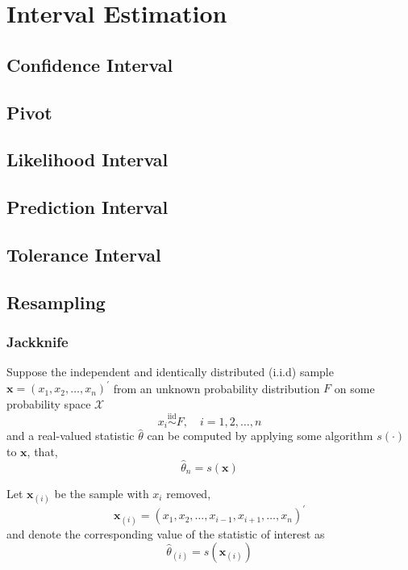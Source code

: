 
\chapter{Interval Estimation}

\section{Confidence Interval}

\section{Pivot}

\section{Likelihood Interval}

\section{Prediction Interval}

\section{Tolerance Interval}

\section{Resampling}

\subsection{Jackknife}

Suppose the independent and identically distributed (i.i.d) sample $\boldsymbol{x}=\left(x_{1},x_{2},\ldots,x_{n}\right)^{\prime}$ from an unknown probability distribution $F$ on some probability space $\mathcal{X}$
\begin{equation}
    x_{i}\stackrel{\text{iid}}{\sim}F,\quad i=1,2,\ldots,n
\end{equation}
and a real-valued statistic $\hat{\theta}$ can be computed by applying some algorithm $s(\cdot)$ to $\mathbf{x}$, that,
\begin{equation}
    \hat{\theta}_{n}=s(\mathbf{x})
\end{equation}

Let $\mathbf{x}_{(i)}$ be the sample with $x_{i}$ removed,
\begin{equation}
    \mathbf{x}_{(i)}=\left(x_{1},x_{2},\ldots,x_{i-1},x_{i+1},\ldots,x_{n}\right)^{\prime}
\end{equation}
and denote the corresponding value of the statistic of interest as
\begin{equation}
    \hat{\theta}_{(i)}=s\left(\mathbf{x}_{(i)}\right)
\end{equation}

